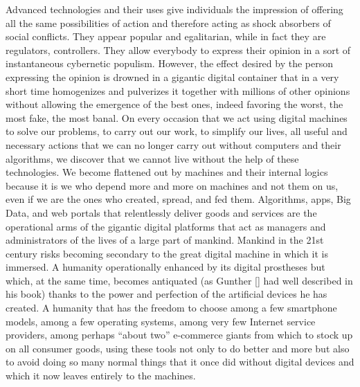 Advanced technologies and their uses give individuals the impression of offering all the same possibilities of action and therefore acting as shock absorbers of social conflicts. They appear popular and egalitarian, while in fact they are regulators, controllers. They allow everybody to express their opinion in a sort of instantaneous cybernetic populism. However, the effect desired by the person expressing the opinion is drowned in a gigantic digital container that in a very short time homogenizes and pulverizes it together with millions of other opinions without allowing the emergence of the best ones, indeed favoring the worst, the most fake, the most banal. On every occasion that we act using digital machines to solve our problems, to carry out our work, to simplify our lives, all useful and necessary actions that we can no longer carry out without computers and their algorithms, we discover that we cannot live without the help of these technologies. We become flattened out by machines and their internal logics because it is we who depend more and more on machines and not them on us, even if we are the ones who created, spread, and fed them. Algorithms, apps, Big Data, and web portals that relentlessly deliver goods and services are the operational arms of the gigantic digital platforms that act as managers and administrators of the lives of a large part of mankind. Mankind in the 21st century risks becoming secondary to the great digital machine in which it is immersed. A humanity operationally enhanced by its digital prostheses but which, at the same time, becomes antiquated (as Gunther \citeauthor{chap:8:Anders:2002} [\citeyear{chap:8:Anders:2002}] had well described in his book) thanks to the power and perfection of the artificial devices he has created. A humanity that has the freedom to choose among a few smartphone models, among a few operating systems, among very few Internet service providers, among perhaps ``about two'' e-commerce giants from which to stock up on all consumer goods, using these tools not only to do better and more but also to avoid doing so many normal things that it once did without digital devices and which it now leaves entirely to the machines.

